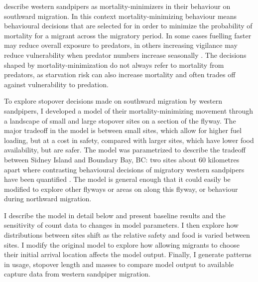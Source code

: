 \citet{Hope2011} describe western sandpipers as mortality-minimizers in their behaviour on southward migration. In this context mortality-minimizing behaviour means behavioural decisions that are selected for in order to minimize the probability of mortality for a migrant across the migratory period. In some cases fuelling faster may reduce overall exposure to predators, in others increasing vigilance may reduce vulnerability when predator numbers increase seasonally \citep{Hope2014}. The decisions shaped by mortality-minimization do not always refer to mortality from predators, as starvation risk can also increase mortality and often trades off against vulnerability to predation.  


To explore stopover decisions made on southward migration by western sandpipers, I developed a model of their mortality-minimizing movement through a landscape of small and large stopover sites on a section of the flyway. The major tradeoff in the model is between small sites, which allow for higher fuel loading, but at a cost in safety, compared with larger sites, which have lower food availability, but are safer. The model was parametrized to describe the tradeoff between Sidney Island and Boundary Bay, BC: two sites about 60 kilometres apart where contrasting behavioural decisions of migratory western sandpipers have been quantified \citep[e.g. ][]{Ydenberg2002,ydenberg_western_2004}. The model is general enough that it could easily be modified to explore other flyways or areas on along this flyway, or behaviour during northward migration. 

I describe the model in detail below and present baseline results and the sensitivity  of count data to changes in model parameters. I then explore how distributions between sites shift as the relative safety and food is varied between sites. I modify the original model to explore how allowing migrants to choose their initial arrival location affects the model output. Finally, I generate patterns in usage, stopover length and masses to compare model output to available capture data from western sandpiper migration. 